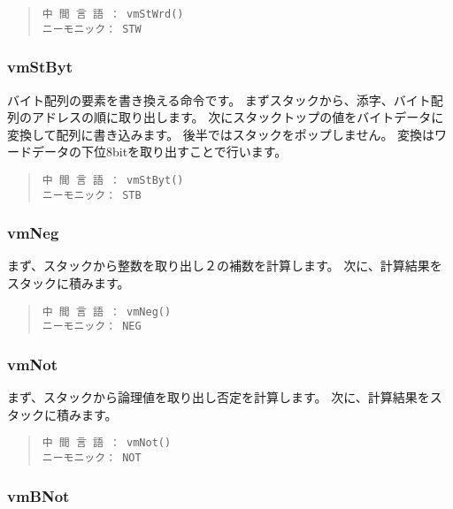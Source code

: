 \begin{quote}
\begin{verbatim}
中 間 言 語 ： vmStWrd()
ニーモニック： STW
\end{verbatim}
\end{quote}

\subsubsection{vmStByt}

バイト配列の要素を書き換える命令です。
まずスタックから、添字、バイト配列のアドレスの順に取り出します。
次にスタックトップの値をバイトデータに変換して配列に書き込みます。
後半ではスタックをポップしません。
変換はワードデータの下位8bitを取り出すことで行います。

\begin{quote}
\begin{verbatim}
中 間 言 語 ： vmStByt()
ニーモニック： STB
\end{verbatim}
\end{quote}

\subsubsection{vmNeg}

まず、スタックから整数を取り出し２の補数を計算します。
次に、計算結果をスタックに積みます。

\begin{quote}
\begin{verbatim}
中 間 言 語 ： vmNeg()
ニーモニック： NEG
\end{verbatim}
\end{quote}

\subsubsection{vmNot}

まず、スタックから論理値を取り出し否定を計算します。
次に、計算結果をスタックに積みます。

\begin{quote}
\begin{verbatim}
中 間 言 語 ： vmNot()
ニーモニック： NOT
\end{verbatim}
\end{quote}

\subsubsection{vmBNot}

